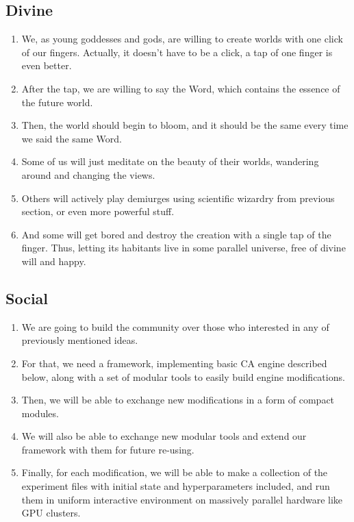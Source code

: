 \documentclass[a4paper,12pt,tikz,UTF8]{article}
\begin{document}
  \subsection{Divine}

  \begin{enumerate}
    \item We, as young goddesses and gods, are willing to create worlds with one click of our fingers. Actually, it doesn't have to be a click, a tap of one finger is even better.
    \item After the tap, we are willing to say the Word, which contains the essence of the future world.
    \item Then, the world should begin to bloom, and it should be the same every time we said the same Word.
    \item Some of us will just meditate on the beauty of their worlds, wandering around and changing the views.
    \item Others will actively play demiurges using scientific wizardry from previous section, or even more powerful stuff.
    \item And some will get bored and destroy the creation with a single tap of the finger. Thus, letting its habitants live in some parallel universe, free of divine will and happy.
  \end{enumerate}

  \subsection{Social}

  \begin{enumerate}
    \item We are going to build the community over those who interested in any of previously mentioned ideas.
    \item For that, we need a framework, implementing basic CA engine described below, along with a set of modular tools to easily build engine modifications.
    \item Then, we will be able to exchange new modifications in a form of compact modules.
    \item We will also be able to exchange new modular tools and extend our framework with them for future re-using.
    \item Finally, for each modification, we will be able to make a collection of the experiment files with initial state and hyperparameters included, and run them in uniform interactive environment on massively parallel hardware like GPU clusters.
  \end{enumerate}
\end{document}

